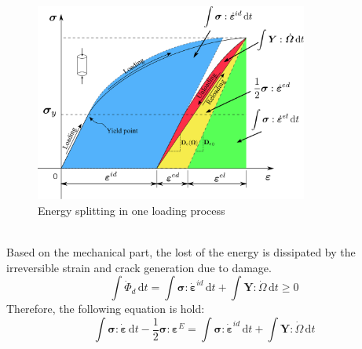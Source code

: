 \documentclass[preprint,review,12pt]{elsarticle}
\newcommand{\ud}{\textrm{d}}
\begin{document}
\begin{figure}[htbp]
   \centering
   \includegraphics[width=0.8\textwidth]{inkscape/energy_split/energy_split2.eps}
   \caption{Energy splitting in one loading process}
   \label{fig:energysplit2}
\end{figure}
\
\\
Based on the mechanical part, the lost of the energy is dissipated by the irreversible strain and crack generation due to damage.
%
\begin{equation}\label{eq:elost2}
   \int \dot\varPhi_{d} \, \ud t = \int\bm\sigma:\dot{\bm\varepsilon}^{id}\,\textrm{d}t + \int \bm{Y}:\dot{\bm\varOmega}\,\ud t \ge 0
\end{equation}
%
Therefore, the following equation is hold:
%
\begin{equation}
   \label{eq:energy2}
   \int \bm\sigma:\dot{\bm\varepsilon}\,\ud t -\frac{1}{2}\bm\sigma:\bm\varepsilon^E = \int \bm\sigma:\dot{\bm\varepsilon}^{id}\,\ud t+\int \bm{Y}:\dot{\bm\varOmega}\,\ud t
\end{equation}
%
%
\end{document}
